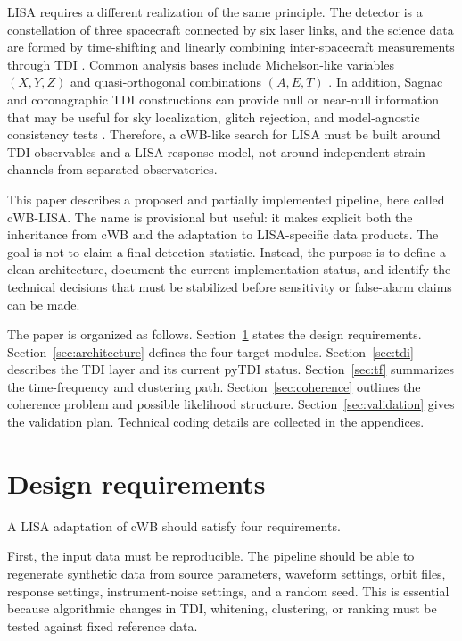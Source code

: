\documentclass[%
 reprint,
 amsmath,amssymb,
 aps,
 prd,
]{revtex4-2}
\begin{document}
LISA requires a different realization of the same principle.  The detector is a constellation of three spacecraft connected by six laser links, and the science data are formed by time-shifting and linearly combining inter-spacecraft measurements through TDI \cite{Tinto2005TDI}.  Common analysis bases include Michelson-like variables $(X,Y,Z)$ and quasi-orthogonal combinations $(A,E,T)$ \cite{LISA2017}.  In addition, Sagnac and coronagraphic TDI constructions can provide null or near-null information that may be useful for sky localization, glitch rejection, and model-agnostic consistency tests \cite{CostaBarroso2024Coronagraphic}.  Therefore, a cWB-like search for LISA must be built around TDI observables and a LISA response model, not around independent strain channels from separated observatories.

This paper describes a proposed and partially implemented pipeline, here called cWB-LISA.  The name is provisional but useful: it makes explicit both the inheritance from cWB and the adaptation to LISA-specific data products.  The goal is not to claim a final detection statistic.  Instead, the purpose is to define a clean architecture, document the current implementation status, and identify the technical decisions that must be stabilized before sensitivity or false-alarm claims can be made.

The paper is organized as follows.  Section~\ref{sec:requirements} states the design requirements.  Section~\ref{sec:architecture} defines the four target modules.  Section~\ref{sec:tdi} describes the TDI layer and its current pyTDI status.  Section~\ref{sec:tf} summarizes the time-frequency and clustering path.  Section~\ref{sec:coherence} outlines the coherence problem and possible likelihood structure.  Section~\ref{sec:validation} gives the validation plan.  Technical coding details are collected in the appendices.

\section{Design requirements}
\label{sec:requirements}

A LISA adaptation of cWB should satisfy four requirements.

First, the input data must be reproducible.  The pipeline should be able to regenerate synthetic data from source parameters, waveform settings, orbit files, response settings, instrument-noise settings, and a random seed.  This is essential because algorithmic changes in TDI, whitening, clustering, or ranking must be tested against fixed reference data.
\end{document}
